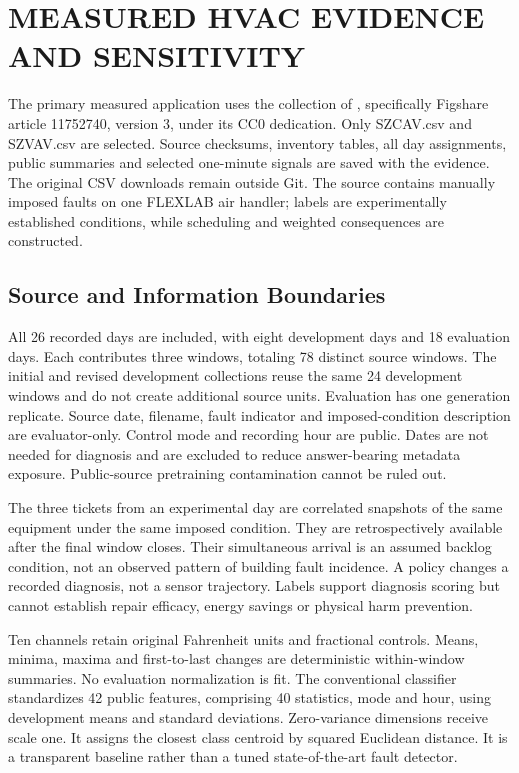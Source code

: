 \section{MEASURED HVAC EVIDENCE AND SENSITIVITY}
\noindent The primary measured application uses the collection of \cite{granderson2020data}, specifically Figshare article 11752740, version 3, under its CC0 dedication. Only SZCAV.csv and SZVAV.csv are selected. Source checksums, inventory tables, all day assignments, public summaries and selected one-minute signals are saved with the evidence. The original CSV downloads remain outside Git. The source contains manually imposed faults on one FLEXLAB air handler; labels are experimentally established conditions, while scheduling and weighted consequences are constructed.\draftcredit

\subsection{Source and Information Boundaries}
All 26 recorded days are included, with eight development days and 18 evaluation days. Each contributes three windows, totaling 78 distinct source windows. The initial and revised development collections reuse the same 24 development windows and do not create additional source units. Evaluation has one generation replicate. Source date, filename, fault indicator and imposed-condition description are evaluator-only. Control mode and recording hour are public. Dates are not needed for diagnosis and are excluded to reduce answer-bearing metadata exposure. Public-source pretraining contamination cannot be ruled out.

The three tickets from an experimental day are correlated snapshots of the same equipment under the same imposed condition. They are retrospectively available after the final window closes. Their simultaneous arrival is an assumed backlog condition, not an observed pattern of building fault incidence. A policy changes a recorded diagnosis, not a sensor trajectory. Labels support diagnosis scoring but cannot establish repair efficacy, energy savings or physical harm prevention.

Ten channels retain original Fahrenheit units and fractional controls. Means, minima, maxima and first-to-last changes are deterministic within-window summaries. No evaluation normalization is fit. The conventional classifier standardizes 42 public features, comprising 40 statistics, mode and hour, using development means and standard deviations. Zero-variance dimensions receive scale one. It assigns the closest class centroid by squared Euclidean distance. It is a transparent baseline rather than a tuned state-of-the-art fault detector.

